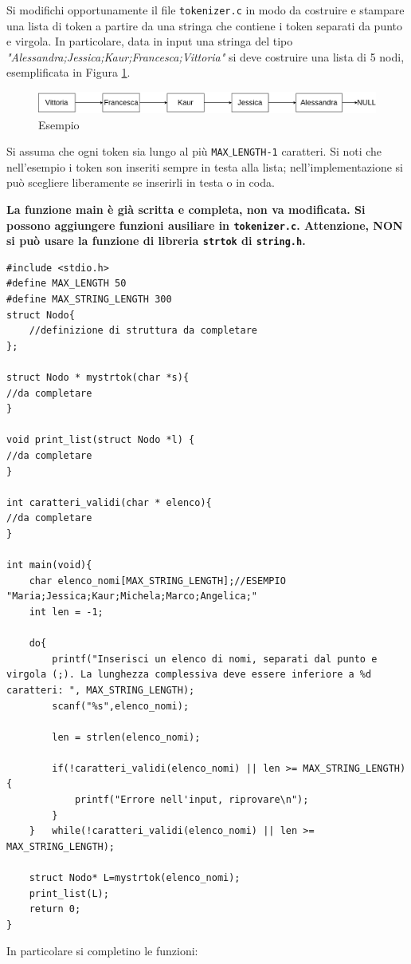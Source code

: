 \documentclass[12pt]{article}
\begin{document}
Si modifichi opportunamente il file \texttt{tokenizer.c} in modo da costruire e stampare una lista di token a partire da una stringa che contiene i token separati da punto e virgola. 
In particolare, data in input una stringa del tipo \emph{"Alessandra;Jessica;Kaur;Francesca;Vittoria"} si deve costruire una lista di 5 nodi, esemplificata in Figura \ref{fig1}.
\begin{figure}
    \centering
    \includegraphics[width=0.8\linewidth]{es1.png}
    \caption{Esempio}
    \label{fig1}
\end{figure}
Si assuma che ogni token sia lungo al più \texttt{MAX$\_$LENGTH-1} caratteri.
Si noti che nell'esempio i token son inseriti sempre in testa alla lista; nell'implementazione si può scegliere liberamente se inserirli in testa o in coda.
\begin{mdframed}[backgroundcolor=myLightBlue] 
  \vspace*{-0.5ex}
  \textbf{La funzione main è gi\`a scritta e completa, non va modificata. Si possono aggiungere funzioni ausiliare in \texttt{tokenizer.c}. Attenzione, NON si può usare la funzione di libreria \texttt{strtok} di \texttt{string.h}.}
\end{mdframed}
%
\begin{lstlisting}[language=myC]
#include <stdio.h>
#define MAX_LENGTH 50
#define MAX_STRING_LENGTH 300
struct Nodo{
    //definizione di struttura da completare 
};

struct Nodo * mystrtok(char *s){
//da completare
}

void print_list(struct Nodo *l) {
//da completare
}

int caratteri_validi(char * elenco){	
//da completare
}

int main(void){
	char elenco_nomi[MAX_STRING_LENGTH];//ESEMPIO "Maria;Jessica;Kaur;Michela;Marco;Angelica;"
	int len = -1;
	
	do{
		printf("Inserisci un elenco di nomi, separati dal punto e virgola (;). La lunghezza complessiva deve essere inferiore a %d caratteri: ", MAX_STRING_LENGTH);	
		scanf("%s",elenco_nomi);

		len = strlen(elenco_nomi);
		
		if(!caratteri_validi(elenco_nomi) || len >= MAX_STRING_LENGTH) {
			printf("Errore nell'input, riprovare\n");
		}
	}	while(!caratteri_validi(elenco_nomi) || len >= MAX_STRING_LENGTH);
	
	struct Nodo* L=mystrtok(elenco_nomi);
	print_list(L);	
	return 0;
}	
\end{lstlisting}
In particolare si completino le funzioni:
\end{document}
